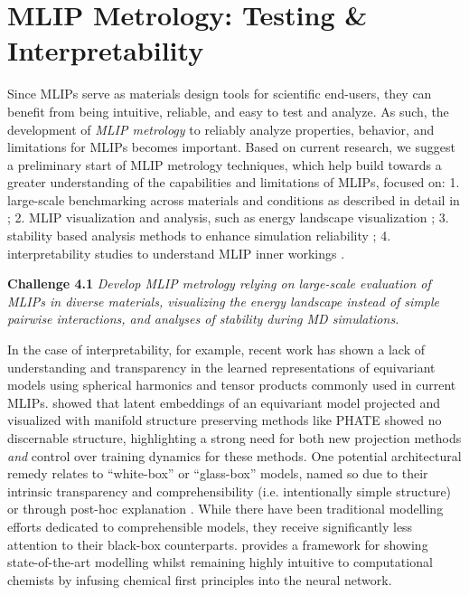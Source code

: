 \vspace{-0.2cm}
\section{MLIP Metrology: Testing \& Interpretability} \label{sec:eval}
\vspace{-0.1cm}


Since MLIPs serve as materials design tools for scientific end-users, they can benefit from being intuitive, reliable, and easy to test and analyze. As such, the development of \emph{MLIP metrology} to reliably analyze properties, behavior, and limitations for MLIPs becomes important. Based on current research, we suggest a preliminary start of MLIP metrology techniques, which help build towards a greater understanding of the capabilities and limitations of MLIPs, focused on: 1. large-scale benchmarking across materials and conditions as described in detail in ; 2. MLIP visualization and analysis, such as energy landscape visualization \citep{bihani2024lowdimensional}; 3. stability based analysis methods to enhance simulation reliability \citep{brandstetter2022message,raja2024stability,ibayashi2023allegro}; 4. interpretability studies to understand MLIP inner workings \citep{leeDeconstructingEquivariantRepresentations2024}. 

\textbf{Challenge 4.1} \textit{Develop MLIP metrology relying on large-scale evaluation of MLIPs in diverse materials, visualizing the energy landscape instead of simple pairwise interactions, and analyses of stability during MD simulations.} 

In the case of interpretability, for example, recent work has shown a lack of understanding and transparency in the learned representations of equivariant models using spherical harmonics and tensor products commonly used in current MLIPs. \citet{leeDeconstructingEquivariantRepresentations2024} showed that latent embeddings of an equivariant model projected and visualized with manifold structure preserving methods like PHATE \citep{moonVisualizingStructureTransitions2019} showed no discernable structure, highlighting a strong need for both new projection methods \emph{and} control over training dynamics for these methods. One potential architectural remedy relates to ``white-box'' or ``glass-box'' models, named so due to their intrinsic transparency and comprehensibility (i.e. intentionally simple structure) or through post-hoc explanation \citep{esdersAnalyzingAtomicInteractions2025,goethalsNonlinearNatureCost2022, esders2024analyzing, wangX2GNNPhysicalMessage2024}. While there have been traditional modelling efforts dedicated to comprehensible models, they receive significantly less attention to their black-box counterparts. \citet{pfauAccurateComputationQuantum2024} provides a framework for showing state-of-the-art modelling whilst remaining highly intuitive to computational chemists by infusing chemical first principles into the neural network. 

